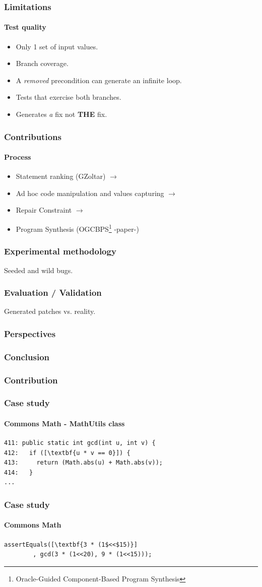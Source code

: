 \documentclass[onlymath]{beamer}
\begin{document}
  \frame
  {
    \frametitle{Limitations}
    \framesubtitle{Test quality}
\begin{itemize}
\item Only 1 set of input values.
\item Branch coverage.
\item A \textit{removed} precondition can generate an infinite loop.
\item Tests that exercise both branches.
\item Generates \textit{a} fix not \textbf{THE} fix.
\end{itemize}        
  }

  \frame
  {  
    \frametitle{Contributions}
      \framesubtitle{Process}
\begin{itemize}
\item Statement ranking (GZoltar)  $\rightarrow$
\item Ad hoc code manipulation and values capturing $\rightarrow$
\item Repair Constraint  $\rightarrow$
\item Program Synthesis (OGCBPS\footnote{Oracle-Guided Component-Based Program Synthesis} -paper-)
\end{itemize}
}


  \frame
  {
    \frametitle{Experimental methodology}
    Seeded and wild bugs.
  }
  
  \frame
  {
    \frametitle{Evaluation / Validation}
    Generated patches vs. reality.
  }
  
  \frame
  {
    \frametitle{Perspectives}
    
  }
  
  \frame
  {
    \frametitle{Conclusion}
    
  }

  \frame
  {
    \frametitle{Contribution}
    
  }
  
 \begin{frame}[fragile]
    \frametitle{Case study}
      \framesubtitle{Commons Math - MathUtils class}
\begin{lstlisting}[escapeinside=\[\]]
411: public static int gcd(int u, int v) {
412:   if ([\textbf{u * v == 0}]) {
413:     return (Math.abs(u) + Math.abs(v));
414:   }
...
\end{lstlisting}
\end{frame}

 \begin{frame}[fragile]
    \frametitle{Case study}
      \framesubtitle{Commons Math}
        \begin{lstlisting}[escapeinside=\[\]]
assertEquals([\textbf{3 * (1$<<$15)}]
        , gcd(3 * (1<<20), 9 * (1<<15)));
	\end{lstlisting}
\end{frame}
\end{document}
